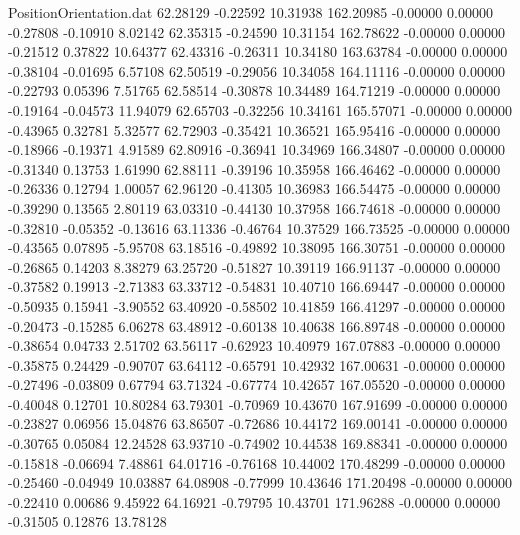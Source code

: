 \begin{filecontents}{PositionOrientation.dat}
  62.28129   -0.22592   10.31938   162.20985   -0.00000    0.00000   -0.27808   -0.10910    8.02142
  62.35315   -0.24590   10.31154   162.78622   -0.00000    0.00000   -0.21512    0.37822   10.64377
  62.43316   -0.26311   10.34180   163.63784   -0.00000    0.00000   -0.38104   -0.01695    6.57108
  62.50519   -0.29056   10.34058   164.11116   -0.00000    0.00000   -0.22793    0.05396    7.51765
  62.58514   -0.30878   10.34489   164.71219   -0.00000    0.00000   -0.19164   -0.04573   11.94079
  62.65703   -0.32256   10.34161   165.57071   -0.00000    0.00000   -0.43965    0.32781    5.32577
  62.72903   -0.35421   10.36521   165.95416   -0.00000    0.00000   -0.18966   -0.19371    4.91589
  62.80916   -0.36941   10.34969   166.34807   -0.00000    0.00000   -0.31340    0.13753    1.61990
  62.88111   -0.39196   10.35958   166.46462   -0.00000    0.00000   -0.26336    0.12794    1.00057
  62.96120   -0.41305   10.36983   166.54475   -0.00000    0.00000   -0.39290    0.13565    2.80119
  63.03310   -0.44130   10.37958   166.74618   -0.00000    0.00000   -0.32810   -0.05352   -0.13616
  63.11336   -0.46764   10.37529   166.73525   -0.00000    0.00000   -0.43565    0.07895   -5.95708
  63.18516   -0.49892   10.38095   166.30751   -0.00000    0.00000   -0.26865    0.14203    8.38279
  63.25720   -0.51827   10.39119   166.91137   -0.00000    0.00000   -0.37582    0.19913   -2.71383
  63.33712   -0.54831   10.40710   166.69447   -0.00000    0.00000   -0.50935    0.15941   -3.90552
  63.40920   -0.58502   10.41859   166.41297   -0.00000    0.00000   -0.20473   -0.15285    6.06278
  63.48912   -0.60138   10.40638   166.89748   -0.00000    0.00000   -0.38654    0.04733    2.51702
  63.56117   -0.62923   10.40979   167.07883   -0.00000    0.00000   -0.35875    0.24429   -0.90707
  63.64112   -0.65791   10.42932   167.00631   -0.00000    0.00000   -0.27496   -0.03809    0.67794
  63.71324   -0.67774   10.42657   167.05520   -0.00000    0.00000   -0.40048    0.12701   10.80284
  63.79301   -0.70969   10.43670   167.91699   -0.00000    0.00000   -0.23827    0.06956   15.04876
  63.86507   -0.72686   10.44172   169.00141   -0.00000    0.00000   -0.30765    0.05084   12.24528
  63.93710   -0.74902   10.44538   169.88341   -0.00000    0.00000   -0.15818   -0.06694    7.48861
  64.01716   -0.76168   10.44002   170.48299   -0.00000    0.00000   -0.25460   -0.04949   10.03887
  64.08908   -0.77999   10.43646   171.20498   -0.00000    0.00000   -0.22410    0.00686    9.45922
  64.16921   -0.79795   10.43701   171.96288   -0.00000    0.00000   -0.31505    0.12876   13.78128

\end{filecontents}
